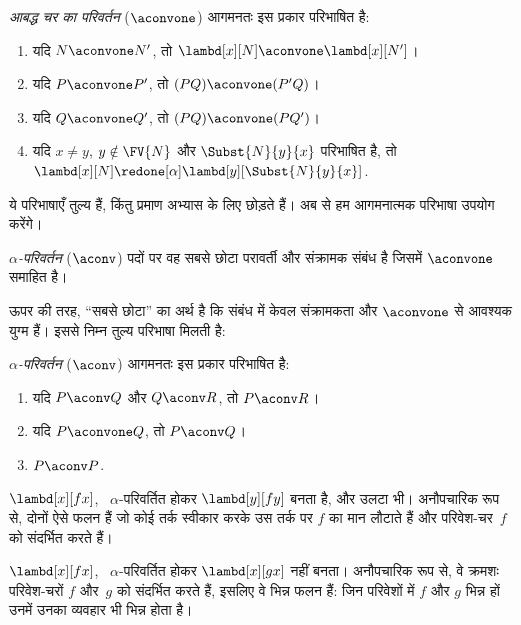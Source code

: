 \documentclass[../../../include/open-logic-section]{subfiles}
\begin{document}
\begin{defn} 
  \emph{आबद्ध चर का परिवर्तन} ($\aconvone$) आगमनतः इस प्रकार परिभाषित है:
  \begin{enumerate}
  \item यदि $N \aconvone N'$, तो $\lambd[x][N] \aconvone
    \lambd[x][N']$। 
  \item यदि $P \aconvone P'$, तो $(PQ) \aconvone (P'Q)$। 
  \item यदि $Q \aconvone Q'$, तो $(PQ) \aconvone (PQ')$। 
  \item यदि $x \neq y$, $y \notin \FV{N}$ और $\Subst{N}{y}{x}$ परिभाषित है, तो
    $\lambd[x][N] \redone[\alpha] \lambd[y][\Subst{N}{y}{x}]$.
  \end{enumerate}
\end{defn}

ये परिभाषाएँ तुल्य हैं, किंतु प्रमाण अभ्यास के लिए छोड़ते हैं। अब से हम
आगमनात्मक परिभाषा उपयोग करेंगे।

\begin{defn}
  \emph{$\alpha$-परिवर्तन} ($\aconv$) पदों पर वह सबसे छोटा परावर्ती और
  संक्रामक संबंध है जिसमें $\aconvone$ समाहित है।
\end{defn}

ऊपर की तरह, ``सबसे छोटा'' का अर्थ है कि संबंध में केवल संक्रामकता और
$\aconvone$ से आवश्यक युग्म हैं। इससे निम्न तुल्य परिभाषा मिलती है:

\begin{defn} 
  \emph{$\alpha$-परिवर्तन} ($\aconv$) आगमनतः इस प्रकार परिभाषित है:
  \begin{enumerate}
  \item यदि $P \aconv Q$ और $Q \aconv R$, तो $P \aconv R$।
  \item यदि $P \aconvone Q$, तो $P \aconv Q$। 
  \item $P \aconv P$. 
  \end{enumerate}
\end{defn}

\begin{ex}
  $\lambd[x][f x]$, ~$\alpha$-परिवर्तित होकर $\lambd[y][f y]$ बनता है,
  और उलटा भी। अनौपचारिक रूप से, दोनों ऐसे फलन हैं जो कोई तर्क स्वीकार करके
  उस तर्क पर $f$ का मान लौटाते हैं और परिवेश-चर~$f$ को संदर्भित करते हैं।

  $\lambd[x][f x]$, ~$\alpha$-परिवर्तित होकर $\lambd[x][g x]$ नहीं बनता।
  अनौपचारिक रूप से, वे क्रमशः परिवेश-चरों $f$ और~$g$ को संदर्भित करते हैं,
  इसलिए वे भिन्न फलन हैं: जिन परिवेशों में $f$ और $g$ भिन्न हों उनमें उनका
  व्यवहार भी भिन्न होता है।
\end{ex}
\end{document}
